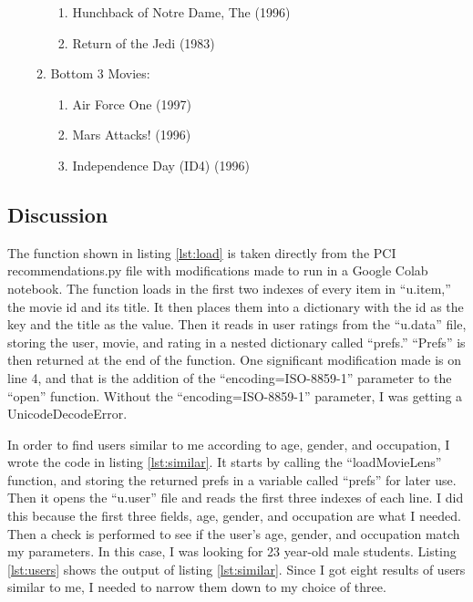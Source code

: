 \documentclass[12pt]{article}
\begin{document}
\begin{enumerate}
\begin{enumerate}
\begin{enumerate}
            \item Hunchback of Notre Dame, The (1996)
            \item Return of the Jedi (1983)
        \end{enumerate}
        \item Bottom 3 Movies:
        \begin{enumerate}
            \item Air Force One (1997)
            \item Mars Attacks! (1996)
            \item Independence Day (ID4) (1996)
        \end{enumerate}
    \end{enumerate}
\end{enumerate}




\subsection*{Discussion}

The function shown in listing \ref{lst:load} is taken directly from the PCI recommendations.py file with modifications made to run in a Google Colab notebook.  The function loads in the first two indexes of every item in ``u.item,'' the movie id and its title.  It then places them into a dictionary with the id as the key and the title as the value.  Then it reads in user ratings from the ``u.data'' file, storing the user, movie, and rating in a nested dictionary called ``prefs.''  ``Prefs'' is then returned at the end of the function.  One significant modification made is on line 4, and that is the addition of the ``encoding=ISO-8859-1'' parameter to the ``open'' function.  Without the ``encoding=ISO-8859-1'' parameter, I was getting a UnicodeDecodeError.  

In order to find users similar to me according to age, gender, and occupation, I wrote the code in listing \ref{lst:similar}.  It starts by calling the ``loadMovieLens'' function, and storing the returned prefs in a variable called ``prefs'' for later use.  Then it opens the ``u.user'' file and reads the first three indexes of each line.  I did this because the first three fields, age, gender, and occupation are what I needed.  Then a check is performed to see if the user's age, gender, and occupation match my parameters.  In this case, I was looking for 23 year-old male students.  Listing \ref{lst:users} shows the output of listing \ref{lst:similar}.  Since I got eight results of users similar to me, I needed to narrow them down to my choice of three.
\end{document}
